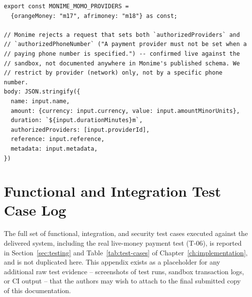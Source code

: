 \begin{verbatim}
export const MONIME_MOMO_PROVIDERS =
  {orangeMoney: "m17", afrimoney: "m18"} as const;

// Monime rejects a request that sets both `authorizedProviders` and
// `authorizedPhoneNumber` ("A payment provider must not be set when a
// paying phone number is specified.") -- confirmed live against the
// sandbox, not documented anywhere in Monime's published schema. We
// restrict by provider (network) only, not by a specific phone number.
body: JSON.stringify({
  name: input.name,
  amount: {currency: input.currency, value: input.amountMinorUnits},
  duration: `${input.durationMinutes}m`,
  authorizedProviders: [input.providerId],
  reference: input.reference,
  metadata: input.metadata,
})
\end{verbatim}

\chapter{Functional and Integration Test Case Log}
\label{app:tests}

The full set of functional, integration, and security test cases executed
against the delivered system, including the real live-money payment test
(T-06), is reported in Section~\ref{sec:testing} and
Table~\ref{tab:test-cases} of Chapter~\ref{ch:implementation}, and is not
duplicated here. This appendix exists as a placeholder for any additional
raw test evidence -- screenshots of test runs, sandbox transaction logs, or
CI output -- that the authors may wish to attach to the final submitted
copy of this documentation.

\bigskip
{}
